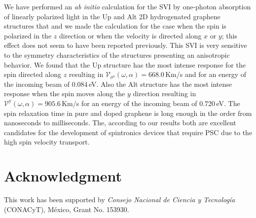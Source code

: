 \documentclass[prb,11pt,tightenlines,twocolumn,aps]{revtex4-1}
\begin{document}
We have performed an \emph{ab initio} calculation for the SVI by one-photon
absorption of linearly polarized light in the Up and Alt 2D
hydrogenated graphene structures that and we made the calculation for the case
when the spin is polarized in the $z$ direction or when the velocity is
directed along $x$ or $y$; this effect does not seem to have been reported
previously. 
% 
This SVI is very sensitive to the symmetry characteristics of the structures
presenting an anisotropic behavior. We found that the Up structure has
the most intense response for the spin directed along $z$ resulting in 
% 
$\mathcal{V}_{\sigma^{\mathrm{z}}} (\omega,\alpha) = 668.0$\,Km/s and 
% 
for an energy of the incoming beam of 0.084\,eV. Also the Alt structure
has the most intense response when the spin moves along the $y$ direction
resulting in 
% 
$\mathcal{V}^{\mathrm{y}} (\omega,\alpha) = 905.6$\,Km/s
% 
for an energy of the incoming beam of 0.720\,eV.
% 
The spin relaxation time in pure and doped graphene is long enough in the order
from nanoseconds to milliseconds. \cite{wojtaszekPRB13,ertlerPRB09} The,
according to our results both are excellent candidates for the development of
spintronics devices that require PSC due to the high spin velocity transport.

\section{Acknowledgment} %

This work has been supported by \emph{Consejo Nacional de Ciencia y
Tecnolog\'ia} (CONACyT), M\'exico, Grant No. 153930.


\end{document}
